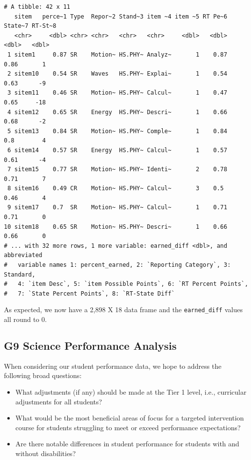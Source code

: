 \documentclass[
  letterpaper,
  DIV=11,
  numbers=noendperiod]{scrartcl}
\begin{document}
\begin{verbatim}
# A tibble: 42 x 11
   sitem   perce~1 Type  Repor~2 Stand~3 item ~4 item ~5 RT Pe~6 State~7 RT-St~8
   <chr>     <dbl> <chr> <chr>   <chr>   <chr>     <dbl>   <dbl>   <dbl>   <dbl>
 1 sitem1     0.87 SR    Motion~ HS.PHY~ Analyz~       1    0.87    0.86       1
 2 sitem10    0.54 SR    Waves   HS.PHY~ Explai~       1    0.54    0.63      -9
 3 sitem11    0.46 SR    Motion~ HS.PHY~ Calcul~       1    0.47    0.65     -18
 4 sitem12    0.65 SR    Energy  HS.PHY~ Descri~       1    0.66    0.68      -2
 5 sitem13    0.84 SR    Motion~ HS.PHY~ Comple~       1    0.84    0.8        4
 6 sitem14    0.57 SR    Energy  HS.PHY~ Calcul~       1    0.57    0.61      -4
 7 sitem15    0.77 SR    Motion~ HS.PHY~ Identi~       2    0.78    0.71       7
 8 sitem16    0.49 CR    Motion~ HS.PHY~ Calcul~       3    0.5     0.46       4
 9 sitem17    0.7  SR    Motion~ HS.PHY~ Calcul~       1    0.71    0.71       0
10 sitem18    0.65 SR    Motion~ HS.PHY~ Descri~       1    0.66    0.66       0
# ... with 32 more rows, 1 more variable: earned_diff <dbl>, and abbreviated
#   variable names 1: percent_earned, 2: `Reporting Category`, 3: Standard,
#   4: `item Desc`, 5: `item Possible Points`, 6: `RT Percent Points`,
#   7: `State Percent Points`, 8: `RT-State Diff`
\end{verbatim}

As expected, we now have a 2,898 X 18 data frame and the
\texttt{earned\_diff} values all round to 0.

\hypertarget{g9-science-performance-analysis}{%
\subsection{G9 Science Performance
Analysis}\label{g9-science-performance-analysis}}

When considering our student performance data, we hope to address the
following broad questions:

\begin{itemize}
\item
  What adjustments (if any) should be made at the Tier 1 level, i.e.,
  curricular adjustments for all students?
\item
  What would be the most beneficial areas of focus for a targeted
  intervention course for students struggling to meet or exceed
  performance expectations?
\item
  Are there notable differences in student performance for students with
  and without disabilities?
\end{itemize}
\end{document}
